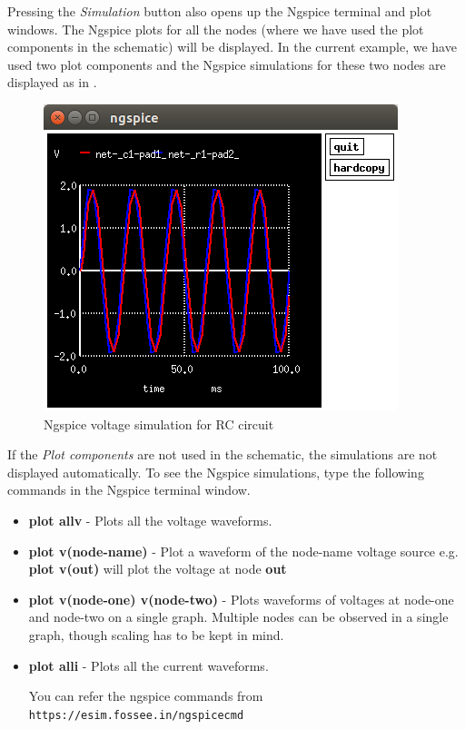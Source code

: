 Pressing the \textit{Simulation} button also opens up the Ngspice terminal and plot windows. The Ngspice plots for all the nodes (where we have used the plot components in the schematic) will be displayed. In the current example, we have used two plot components and the Ngspice simulations for these two nodes are displayed as in .

\begin{figure}
\centering
\includegraphics[width=\lgfig]{manual_images/rc-voltage.png}
\caption{Ngspice voltage simulation for RC circuit}
\label{rc-voltage}
\end{figure}

If the \textit{Plot components} are not used in the schematic, the simulations are not displayed automatically. To see the Ngspice simulations, type the following commands in the Ngspice terminal window.
\begin{itemize}
\item \textbf{plot allv} - Plots all the voltage waveforms.
\item \textbf{plot v(node-name)} - Plot a waveform of the node-name voltage source e.g. \textbf{plot v(out)} will plot the voltage at node \textbf{out} 
\item \textbf{plot v(node-one) v(node-two)} - Plots waveforms of voltages at node-one and node-two on a single graph. Multiple nodes can be observed in a single graph, though scaling has to be kept in mind. 
\item \textbf{plot alli} - Plots all the current waveforms.

You can refer the ngspice commands from {\tt https://esim.fossee.in/ngspicecmd}
\end{itemize}

